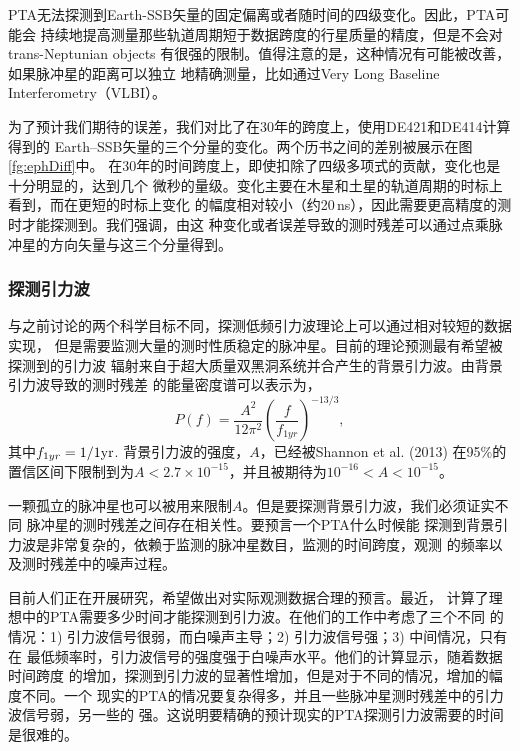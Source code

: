 PTA无法探测到Earth-SSB矢量的固定偏离或者随时间的四级变化。因此，PTA可能会
持续地提高测量那些轨道周期短于数据跨度的行星质量的精度，但是不会对trans-Neptunian objects
有很强的限制。值得注意的是，这种情况有可能被改善，如果脉冲星的距离可以独立
地精确测量，比如通过Very Long Baseline Interferometry（VLBI）。

为了预计我们期待的误差，我们对比了在30年的跨度上，使用DE421和DE414计算得到的
Earth--SSB矢量的三个分量的变化。两个历书之间的差别被展示在图\ref{fg:ephDiff}中。
在30年的时间跨度上，即使扣除了四级多项式的贡献，变化也是十分明显的，达到几个
微秒的量级。变化主要在木星和土星的轨道周期的时标上看到，而在更短的时标上变化
的幅度相对较小（约20\,ns），因此需要更高精度的测时才能探测到。我们强调，由这
种变化或者误差导致的测时残差可以通过点乘脉冲星的方向矢量与这三个分量得到。

\subsubsection{探测引力波}

与之前讨论的两个科学目标不同，探测低频引力波理论上可以通过相对较短的数据实现，
但是需要监测大量的测时性质稳定的脉冲星。目前的理论预测最有希望被探测到的引力波
辐射来自于超大质量双黑洞系统并合产生的背景引力波。由背景引力波导致的测时残差
的能量密度谱可以表示为，
\begin{equation}
\label{eqn:psd}
P(f) = \frac{A^2}{12\pi^2}\left(\frac{f}{f_{1yr}}\right)^{-13/3},
\end{equation}
其中$f_{1yr} = 1/{1 {\rm yr}}$. 背景引力波的强度，$A$，已经被Shannon et al. (2013)
在95\%的置信区间下限制到为$A < 2.7 \times 10^{-15}$，并且被期待为$10^{-16} < A < 10^{-15}$\supercite{ses13}。

一颗孤立的脉冲星也可以被用来限制$A$。但是要探测背景引力波，我们必须证实不同
脉冲星的测时残差之间存在相关性\supercite{hd83}。要预言一个PTA什么时候能
探测到背景引力波是非常复杂的，依赖于监测的脉冲星数目，监测的时间跨度，观测
的频率以及测时残差中的噪声过程。

目前人们正在开展研究，希望做出对实际观测数据合理的预言。最近，\supercite{sejr13}
计算了理想中的PTA需要多少时间才能探测到引力波。在他们的工作中考虑了三个不同
的情况：1) 引力波信号很弱，而白噪声主导；2) 引力波信号强；3) 中间情况，只有在
最低频率时，引力波信号的强度强于白噪声水平。他们的计算显示，随着数据时间跨度
的增加，探测到引力波的显著性增加，但是对于不同的情况，增加的幅度不同。一个
现实的PTA的情况要复杂得多，并且一些脉冲星测时残差中的引力波信号弱，另一些的
强。这说明要精确的预计现实的PTA探测引力波需要的时间是很难的。

